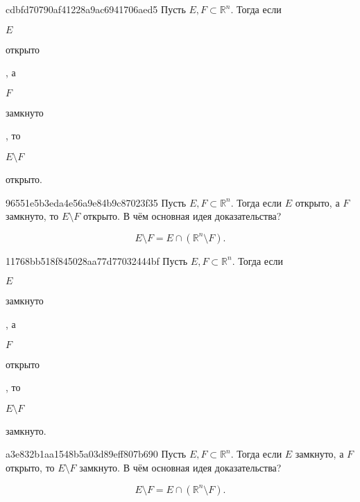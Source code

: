 \begin{note}{cdbfd70790af41228a9ac6941706aed5}
    Пусть \({ E, F \subset \mathbb R^{n} }\). Тогда если \begin{icloze}{4}\({ E }\)\end{icloze} \begin{icloze}{3}открыто\end{icloze}, а \begin{icloze}{4}\({ F }\)\end{icloze} \begin{icloze}{3}замкнуто\end{icloze}, то \begin{icloze}{2}\({ E \setminus F }\)\end{icloze} \begin{icloze}{1}открыто.\end{icloze}
\end{note}

\begin{note}{96551e5b3eda4e56a9e84b9c87023f35}
    Пусть \({ E, F \subset \mathbb R^{n} }\). Тогда если \({ E }\) открыто, а \({ F }\) замкнуто, то \({ E \setminus F }\) открыто.
    В чём основная идея доказательства?

    \begin{cloze}{1}
        \[
            E \setminus F = E \cap (\mathbb R^{n} \setminus F).
        \]
    \end{cloze}
\end{note}

\begin{note}{11768bb518f845028aa77d77032444bf}
    Пусть \({ E, F \subset \mathbb R^{n} }\). Тогда если \begin{icloze}{4}\({ E }\)\end{icloze} \begin{icloze}{3}замкнуто\end{icloze}, а \begin{icloze}{4}\({ F }\)\end{icloze} \begin{icloze}{3}открыто\end{icloze}, то \begin{icloze}{2}\({ E \setminus F }\)\end{icloze} \begin{icloze}{1}замкнуто.\end{icloze}
\end{note}

\begin{note}{a3e832b1aa1548b5a03d89eff807b690}
    Пусть \({ E, F \subset \mathbb R^{n} }\). Тогда если \({ E }\) замкнуто, а \({ F }\) открыто, то \({ E \setminus F }\) замкнуто.
    В чём основная идея доказательства?

    \begin{cloze}{1}
        \[
            E \setminus F = E \cap (\mathbb R^{n} \setminus F).
        \]
    \end{cloze}
\end{note}

